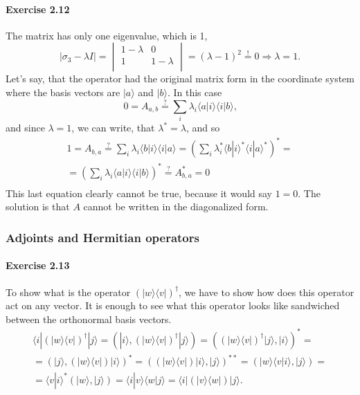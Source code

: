 \documentclass[a4paper,12pt]{article}
\newcommand{\exercise}[1]{\paragraph{Exercise #1}}
\newcommand{\la}{\langle}
\newcommand{\ra}{\rangle}
\begin{document}
    \exercise{2.12} The matrix has only one eigenvalue, which is 1,
    \begin{equation}
        | \sigma_3 - \lambda I | =
        \begin{vmatrix}
            1-\lambda & 0 \\
            1 & 1-\lambda \\
        \end{vmatrix} = (\lambda - 1)^2 \overset{!}{=} 0 \Rightarrow \lambda = 1 \textrm{.}
    \end{equation}
    Let's say, that the operator had the original matrix form in the coordinate system where the basis vectors are $|a\ra$ and $|b\ra$. In this case
    \begin{equation}
        0 = A_{a, b} \overset{?}{=} \sum_i \lambda_i \la a | i \ra \la i | b \ra \textrm{,}
    \end{equation}
    and since $\lambda = 1$, we can write, that $\lambda^* = \lambda$, and so
    \begin{gather}
        \nonumber
        1 = A_{b, a} \overset{?}{=} \sum_i \lambda_i \la b | i \ra \la i | a \ra = \left( \sum_i \lambda_i ^* \la b | i \ra ^* \la i | a \ra ^* \right)^* =\\
        = \left( \sum_i \lambda_i \la a | i \ra \la i | b \ra \right)^* \overset{?}{=} A_{b, a}^* = 0\\
    \end{gather}
    This last equation clearly cannot be true, because it would say $1 = 0$. The solution is that $A$ cannot be written in the diagonalized form.

    \subsubsection{Adjoints and Hermitian operators}

    \exercise{2.13} To show what is the operator $(| w \ra \la v |) ^ \dagger$, we have to show how does this operator act on any vector. It is enough to see what this operator looks like sandwiched between the orthonormal basis vectors.
    \begin{gather}
        \nonumber
        \la i | (| w \ra \la v |) ^ \dagger | j \ra = \left( | i \ra, (| w \ra \la v |)^\dagger | j \ra \right) = \left( (| w \ra \la v |)^\dagger | j \ra, | i \ra \right)^* = \\
        \nonumber
        = \left( | j \ra, (| w \ra \la v |) | i \ra \right)^* = \left((| w \ra \la v |) | i \ra, | j \ra \right)^{**} = \left(| w \ra \la v | i \ra, | j \ra \right) = \\
        = \la v | i \ra ^* \left(| w \ra, | j \ra \right) = \la i | v \ra \la w | j \ra = \la i | ( | v \ra \la w | ) | j \ra \textrm{.}
    \end{gather}
\end{document}
